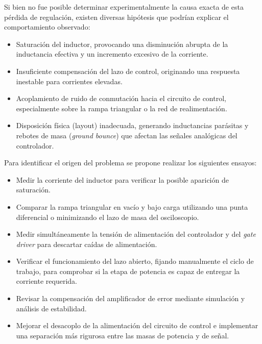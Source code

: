 \documentclass[]{article}
\begin{document}
	Si bien no fue posible determinar experimentalmente la causa exacta de esta pérdida de regulación, existen diversas hipótesis que podrían explicar el comportamiento observado:
	
	\begin{itemize}
		\item Saturación del inductor, provocando una disminución abrupta de la inductancia efectiva y un incremento excesivo de la corriente.

		\item Insuficiente compensación del lazo de control, originando una respuesta inestable para corrientes elevadas.
		
		\item Acoplamiento de ruido de conmutación hacia el circuito de control, especialmente sobre la rampa triangular o la red de realimentación.
		
		\item Disposición física (layout) inadecuada, generando inductancias parásitas y rebotes de masa (\textit{ground bounce}) que afectan las señales analógicas del controlador.
		
		
	\end{itemize}
	
	Para identificar el origen del problema se propone realizar los siguientes ensayos:
	
	\begin{itemize}
		\item Medir la corriente del inductor para verificar la posible aparición de saturación.
		\item Comparar la rampa triangular en vacío y bajo carga utilizando una punta diferencial o minimizando el lazo de masa del osciloscopio.
		\item Medir simultáneamente la tensión de alimentación del controlador y del \textit{gate driver} para descartar caídas de alimentación.
		\item Verificar el funcionamiento del lazo abierto, fijando manualmente el ciclo de trabajo, para comprobar si la etapa de potencia es capaz de entregar la corriente requerida.
		\item Revisar la compensación del amplificador de error mediante simulación y análisis de estabilidad.
		\item Mejorar el desacoplo de la alimentación del circuito de control e implementar una separación más rigurosa entre las masas de potencia y de señal.
	\end{itemize}
\end{document}
